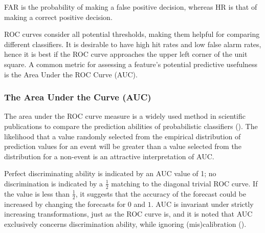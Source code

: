 \documentclass[a4paper,12pt]{article}
\numberwithin{equation}{section}
\begin{document}
   FAR is the probability of making a false positive decision, whereas HR is that of making a correct positive decision.\bigskip

   ROC curves consider all potential thresholds, making them helpful for comparing different classifiers. It is desirable to have high hit rates and low false alarm rates, hence it is best if the ROC curve approaches the upper left corner of the unit square. A common metric for assessing a feature's potential predictive usefulness is the Area Under the ROC Curve (AUC).

   \subsubsection{The Area Under the Curve (AUC)}
   The area under the ROC curve measure is a widely used method in scientific publications to compare the prediction abilities of probabilistic classifiers (\cite{roc3}). The likelihood that a value randomly selected from the empirical distribution of prediction values for an event will be greater than a value selected from the distribution for a non-event is an attractive interpretation of AUC.\bigskip
   
   Perfect discriminating ability is indicated by an AUC value of 1; no discrimination is indicated by a $\frac{1}{2}$ matching to the diagonal trivial ROC curve. If the value is less than $\frac{1}{2}$, it suggests that the accuracy of the forecast could be increased by changing the forecasts for $0$ and $1$. AUC is invariant under strictly increasing transformations, just as the ROC curve is, and it is noted that AUC exclusively concerns discrimination ability, while ignoring (mis)calibration (\cite{roc1}).
\end{document}
